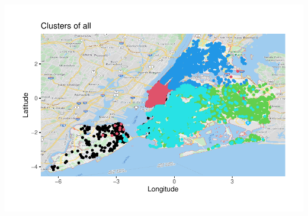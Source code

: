 \documentclass[
]{article}
\newenvironment{Shaded}{\begin{snugshade}}{\end{snugshade}}
\newcommand{\NormalTok}[1]{#1}
\newcommand{\OperatorTok}[1]{\textcolor[rgb]{0.81,0.36,0.00}{\textbf{#1}}}
\begin{document}
\includegraphics{project-code_files/figure-latex/unnamed-chunk-21-1.pdf}

\begin{Shaded}
\end{Shaded}
\end{document}
